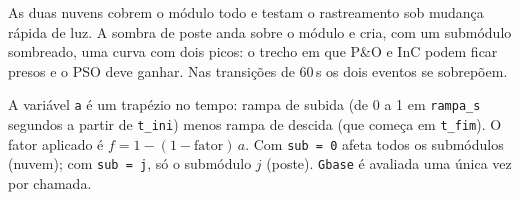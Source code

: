 As duas nuvens cobrem o m\'odulo todo e testam o rastreamento sob mudan\c{c}a r\'apida de luz. A sombra de poste anda sobre o m\'odulo e cria, com um subm\'odulo sombreado, uma curva
com dois picos: o trecho em que P\&O e InC podem ficar presos e o PSO deve ganhar. Nas transi\c{c}\~oes de 60\,s os dois eventos se sobrep\~oem.


\begin{logica}
A vari\'avel \texttt{a} \'e um trap\'ezio no tempo: rampa de subida (de 0 a 1 em \texttt{rampa\_s} segundos a partir de \texttt{t\_ini}) menos rampa de descida (que come\c{c}a em \texttt{t\_fim}).
O fator aplicado \'e $f=1-(1-\text{fator})\,a$. Com \texttt{sub = 0} afeta todos os subm\'odulos (nuvem); com \texttt{sub = j}, s\'o o subm\'odulo $j$ (poste). \texttt{Gbase} \'e avaliada uma \'unica vez por chamada.
\end{logica}
